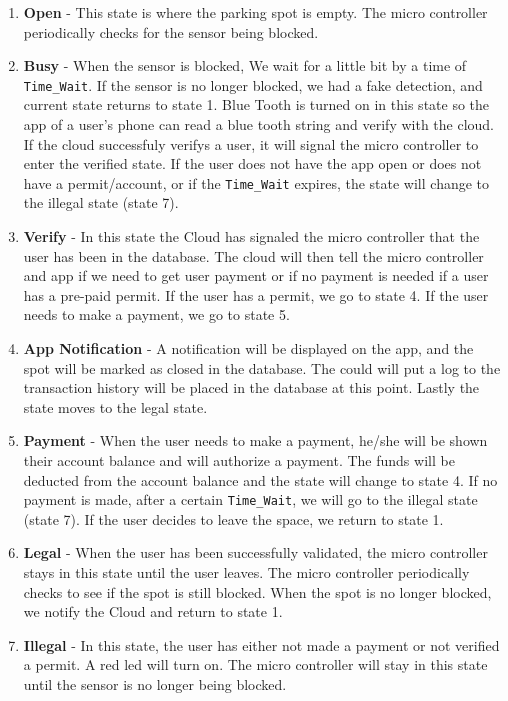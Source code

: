 \documentclass[12pt]{article}
\begin{document}
\begin{enumerate}
\item \textbf{Open} - This state is where the parking
spot is empty. The micro controller periodically checks 
for the sensor being blocked.

\item \textbf{Busy} - When the sensor is blocked, We wait for a little bit by a time of \verb|Time_Wait|. If the
sensor is no longer blocked, we had a fake detection, and
current state returns to state 1. Blue Tooth is turned on 
in this state so the app of a user's phone can read a blue tooth string and verify with the cloud. If the cloud successfuly verifys a user, it will signal the micro controller to enter the verified state. If the user does not have the app open or does not have a permit/account, or if the \verb|Time_Wait| expires, the state will change to the illegal state (state 7).

\item \textbf{Verify} - In this state the Cloud has signaled the micro controller that the user has been in the database. The cloud will then tell the micro controller and app if we need to get user payment or if no payment is needed if a user has a pre-paid permit. If the user has a permit, we go to state 4. If the user needs to make a payment, we go to state 5.
\item \textbf{App Notification} - A notification will be displayed on the app, 
and the spot will be marked as closed in the database. The
could will put a log to the transaction history will be placed in the database at this point. Lastly the state moves to the legal state.

\item \textbf{Payment} - When the user needs to make a payment, he/she will be shown their account balance and will authorize a payment. The funds will be deducted from the account balance and the state will change to state 4. If no payment is made, after a certain \verb|Time_Wait|, we will go to the illegal state (state 7). If the user decides to leave the space, we return to state 1.

\item \textbf{Legal} - When the user has been successfully validated, the micro controller stays in this state until the user leaves. The micro controller periodically checks to see if the spot is still blocked. When the spot is no longer blocked, we notify the Cloud and return to state 1.

\item \textbf{Illegal} - In this state, the user has either not made a payment or not verified a permit. A red led will turn on. The micro controller will stay in this state until the sensor is no longer being blocked.
\end{enumerate}
\end{document}
